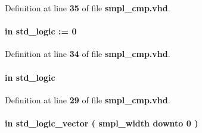 Definition at line {\bf 35} of file {\bf smpl\+\_\+cmp.\+vhd}.

\paragraph[{cmp\+\_\+start}]{ {\bfseries \textcolor{keywordflow}{in}\textcolor{vhdlchar}{ }} {\bfseries \textcolor{comment}{std\+\_\+logic}\textcolor{vhdlchar}{ }\textcolor{vhdlchar}{ }\textcolor{vhdlchar}{\+:}\textcolor{vhdlchar}{=}\textcolor{vhdlchar}{ }\textcolor{vhdlchar}{ }\textcolor{vhdlchar}{\textquotesingle{}}\textcolor{vhdlchar}{ } \textcolor{vhdldigit}{0} \textcolor{vhdlchar}{ }\textcolor{vhdlchar}{\textquotesingle{}}\textcolor{vhdlchar}{ }} \hspace{0.3cm}{\ttfamily [Port]}}\label{classsmpl__cmp_a7b84e4cbf8f5c5ee120d502772becfd9}


Definition at line {\bf 34} of file {\bf smpl\+\_\+cmp.\+vhd}.

\paragraph[{ddr\+\_\+en}]{ {\bfseries \textcolor{keywordflow}{in}\textcolor{vhdlchar}{ }} {\bfseries \textcolor{comment}{std\+\_\+logic}\textcolor{vhdlchar}{ }} \hspace{0.3cm}{\ttfamily [Port]}}\label{classsmpl__cmp_adbfe05e6692f69f8e592df06c6055f0a}


Definition at line {\bf 29} of file {\bf smpl\+\_\+cmp.\+vhd}.

\paragraph[{diq\+\_\+h}]{ {\bfseries \textcolor{keywordflow}{in}\textcolor{vhdlchar}{ }} {\bfseries \textcolor{comment}{std\+\_\+logic\+\_\+vector}\textcolor{vhdlchar}{ }\textcolor{vhdlchar}{(}\textcolor{vhdlchar}{ }\textcolor{vhdlchar}{ }\textcolor{vhdlchar}{ }\textcolor{vhdlchar}{ }{\bfseries {\bf smpl\+\_\+width}} \textcolor{vhdlchar}{ }\textcolor{keywordflow}{downto}\textcolor{vhdlchar}{ }\textcolor{vhdlchar}{ } \textcolor{vhdldigit}{0} \textcolor{vhdlchar}{ }\textcolor{vhdlchar}{)}\textcolor{vhdlchar}{ }} \hspace{0.3cm}{\ttfamily [Port]}}\label{classsmpl__cmp_a4651e281dd19ab1731a4d0851ea44901}



